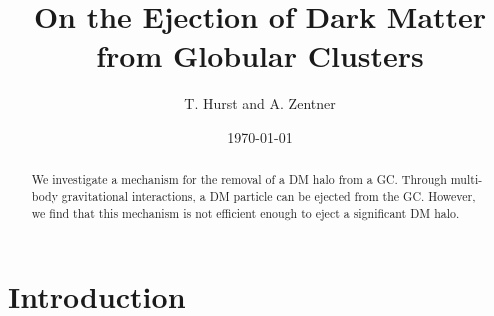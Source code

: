 \documentclass[aps,floatfix,prd,showpacs]{revtex4}
\begin{document}
\title{On the Ejection of Dark Matter from Globular Clusters}
\author{T. Hurst and A. Zentner}

\date{\today}

\begin{abstract}
We investigate a mechanism for the removal of a DM halo from a GC.  Through multi-body gravitational interactions, a DM particle can be ejected from the GC.  However, we find that this mechanism is not efficient enough to eject a significant DM halo.
\end{abstract}
\maketitle

\section{Introduction}
\label{section:intro}



\end{document}
